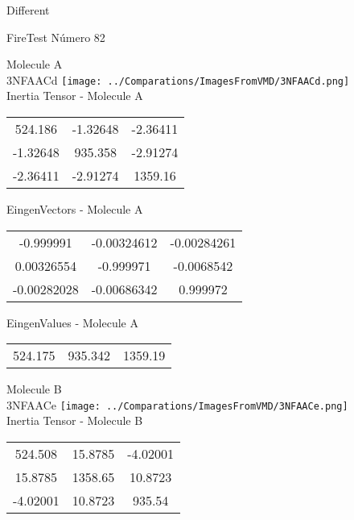 \begin{center}
\vtab
\vtab
\textcolor{NavyBlue}{\Large Different}
\end{center}

 \newpage

\vtab[-2cm]
\begin{center}
{\large FireTest \tab Número 82}
\end{center}
\begin{multicols}{2}
\begin{center}

Molecule A \\ 
3NFAACd
\texttt{[image: ../Comparations/ImagesFromVMD/3NFAACd.png]}
\\
Inertia Tensor - Molecule A \\
\vtab

\begin{tabular}{|c c c|}
524.186	 & 	-1.32648	 & 	-2.36411	 \\
-1.32648	 & 	935.358	 & 	-2.91274	 \\
-2.36411	 & 	-2.91274	 & 	1359.16
\end{tabular}

\vtab
 EingenVectors - Molecule A     \\
\vtab
\begin{tabular}{|c c c|}
-0.999991	 & 	-0.00324612	 & 	-0.00284261	 \\
0.00326554	 & 	-0.999971	 & 	-0.0068542	 \\
-0.00282028	 & 	-0.00686342	 & 	0.999972
\end{tabular}

\vtab
 EingenValues - Molecule A     \\
\vtab
\begin{tabular}{|c c c|}
524.175	 & 	935.342	 & 	1359.19	 \\
\end{tabular}
\columnbreak

Molecule B \\ 
3NFAACe
\texttt{[image: ../Comparations/ImagesFromVMD/3NFAACe.png]}
\\
Inertia Tensor - Molecule B \\
\vtab

\begin{tabular}{|c c c|}
524.508	 & 	15.8785	 & 	-4.02001	 \\
15.8785	 & 	1358.65	 & 	10.8723	 \\
-4.02001	 & 	10.8723	 & 	935.54
\end{tabular}


\end{center}
\end{multicols}
